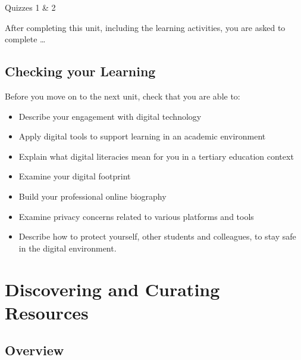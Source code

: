 \documentclass[
]{book}
\providecommand{\tightlist}{%
  \setlength{\itemsep}{0pt}\setlength{\parskip}{0pt}}
\theoremstyle{definition}
\theoremstyle{definition}
\theoremstyle{definition}
\theoremstyle{definition}
\theoremstyle{remark}
\begin{document}
\begin{assessment}
{Quizzes 1 \& 2}

After completing this unit, including the learning activities, you are asked to complete \ldots{}
\end{assessment}

\hypertarget{checking-your-learning}{%
\section*{Checking your Learning}\label{checking-your-learning}}

\begin{progress}
Before you move on to the next unit, check that you are able to:

\begin{itemize}
\tightlist
\item
  Describe your engagement with digital technology\\
\item
  Apply digital tools to support learning in an academic environment\\
\item
  Explain what digital literacies mean for you in a tertiary education context\\
\item
  Examine your digital footprint\\
\item
  Build your professional online biography\\
\item
  Examine privacy concerns related to various platforms and tools\\
\item
  Describe how to protect yourself, other students and colleagues, to stay safe in the digital environment.
\end{itemize}
\end{progress}

\hypertarget{discovering-and-curating-resources}{%
\chapter{Discovering and Curating Resources}\label{discovering-and-curating-resources}}

\hypertarget{overview-1}{%
\section*{Overview}\label{overview-1}}
\end{document}

